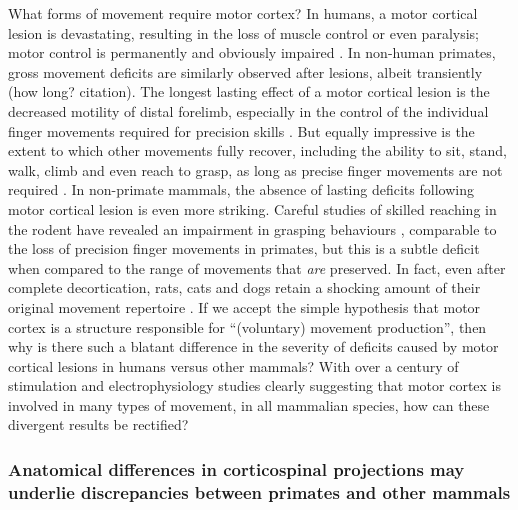 What forms of movement require motor cortex? In humans, a motor cortical lesion is devastating, resulting in the loss of muscle control or even paralysis; motor control is permanently and obviously impaired \cite{Laplane1977}. In non-human primates, gross movement deficits are similarly observed after lesions, albeit transiently (how long? citation). The longest lasting effect of a motor cortical lesion is the decreased motility of distal forelimb, especially in the control of the individual finger movements required for precision skills \cite{Leyton1917,Darling2011}. But equally impressive is the extent to which other movements fully recover, including the ability to sit, stand, walk, climb and even reach to grasp, as long as precise finger movements are not required \cite{Leyton1917,Darling2011,Zaaimi2012}. In non-primate mammals, the absence of lasting deficits following motor cortical lesion is even more striking. Careful studies of skilled reaching in the rodent have revealed an impairment in grasping behaviours \cite{Alaverdashvili2008a}, comparable to the loss of precision finger movements in primates, but this is a subtle deficit when compared to the range of movements that \emph{are} preserved. In fact, even after complete decortication, rats, cats and dogs retain a shocking amount of their original movement repertoire \cite{Bjursten1976,Terry1989}. If we accept the simple hypothesis that motor cortex is a structure responsible for ``(voluntary) movement production'', then why is there such a blatant difference in the severity of deficits caused by motor cortical lesions in humans versus other mammals? With over a century of stimulation and electrophysiology studies clearly suggesting that motor cortex is involved in many types of movement, in all mammalian species, how can these divergent results be rectified?

\subsubsection*{Anatomical differences in corticospinal projections may underlie discrepancies between primates and other mammals}


